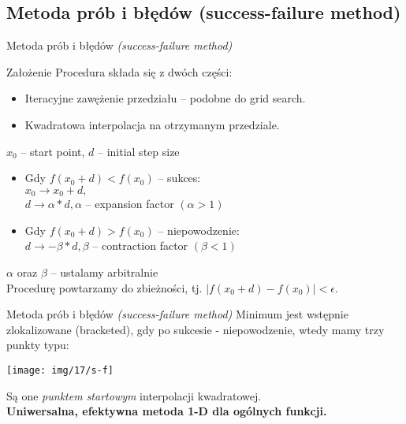 \subsection{Metoda prób i błędów (success-failure method)}
  \begin{frame}{Metoda prób i błędów \emph{(success-failure method)}}
    \begin{block}{Założenie}
      Procedura składa się z dwóch części:
      \begin{itemize}
        \item Iteracyjne zawężenie przedziału -- podobne do grid search.
        \item Kwadratowa interpolacja na otrzymanym przedziale.
      \end{itemize}
    \end{block}
    $x_{0}$ -- start point, $d$ -- initial step size
    \begin{itemize}
      \item Gdy $f(x_{0} + d) < f(x_{0}) $ -- sukces:\\
      $x_{0} \to x_{0} + d,$ \\
      $d \to \alpha * d, \alpha$ -- expansion factor
      $(\alpha > 1)$
      \item Gdy $f(x_{0} + d) > f(x_{0}) $ -- niepowodzenie: \\
      $d \to -\beta * d, \beta$ -- contraction factor
      $(\beta < 1)$
    \end{itemize}
    $\alpha$ oraz $\beta$ -- ustalamy arbitralnie\\
    Procedurę powtarzamy do zbieżności, tj. $|f(x_{0} + d) - f(x_{0})| < \epsilon$.
  \end{frame}

  \begin{frame}{Metoda prób i błędów \emph{(success-failure method)}}
    Minimum jest wstępnie zlokalizowane (bracketed), gdy po sukcesie - niepowodzenie,  wtedy mamy trzy punkty typu:\\
    \begin{center}
      \texttt{[image: img/17/s-f]}
    \end{center}
    Są one \emph{punktem startowym} interpolacji kwadratowej.\\
    \textbf{Uniwersalna, efektywna metoda 1-D dla ogólnych funkcji.}
  \end{frame}
